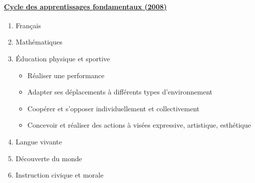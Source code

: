 \documentclass[10pt,french,twocolumn,landscape,a4paper]{article}
\begin{document}
\paragraph{\href{http://www.education.gouv.fr/bo/2008/hs3/programme_CP_CE1.htm}{Cycle des apprentissages fondamentaux (2008)}}
\begin{enumerate}
\item Français
\item Mathématiques
\item Éducation physique et sportive
	\begin{itemize}
	\item Réaliser une performance
	\item Adapter ses déplacements à différents types d’environnement
	\item Coopérer et s’opposer individuellement et collectivement
	\item Concevoir et réaliser des actions à visées expressive, artistique, esthétique
	\end{itemize}
\item Langue vivante
\item Découverte du monde
\item Instruction civique et morale
\end{enumerate}
\end{document}
